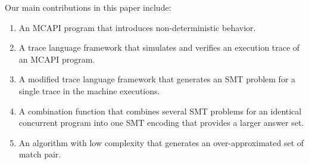 





Our main contributions in this paper include:

\begin{enumerate}
\item An MCAPI program that introduces non-deterministic behavior.
\item A trace language framework that simulates and verifies an execution trace of an MCAPI program.
\item A modified trace language framework that generates an SMT problem for a single trace in the machine executions.
\item A combination function that combines several SMT problems for an identical concurrent program into one SMT encoding that provides a larger answer set.
\item An algorithm with low complexity that generates an over-approximated set of match pair.  
\end{enumerate}






